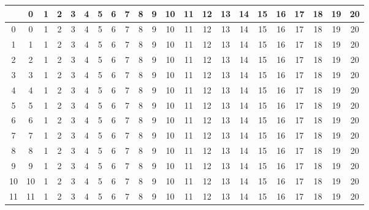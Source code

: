 \documentclass[10pt]{article}
\begin{document}

\newpage



\setlength\extrarowheight{5pt}

\begin{table}[ht]
  \centering
  \begin{tabular}{c|ccc|ccc|ccc|ccc|ccc|ccc|ccc}
    \hline
      & 0 & 1 & 2 & 3 & 4 & 5 & 6 & 7 & 8 & 9 & 10 & 11 & 12 & 13 & 14 & 15 & 16 & 17 & 18 & 19 & 20\\\hline

    \rowcolor{LightCyan}
    0 & 0 & 1 & 2 & 3 & 4 & 5 & 6 & 7 & 8 & 9 & 10 & 11 & 12 & 13 & 14 & 15 & 16 & 17 & 18 & 19 & 20\\
    \rowcolor{LightCyan}
    1 & 1 & 1 & 2 & 3 & 4 & 5 & 6 & 7 & 8 & 9 & 10 & 11 & 12 & 13 & 14 & 15 & 16 & 17 & 18 & 19 & 20\\
    \rowcolor{LightCyan}
    2 & 2 & 1 & 2 & 3 & 4 & 5 & 6 & 7 & 8 & 9 & 10 & 11 & 12 & 13 & 14 & 15 & 16 & 17 & 18 & 19 & 20\\

    3 & 3 & 1 & 2 & 3 & 4 & 5 & 6 & 7 & 8 & 9 & 10 & 11 & 12 & 13 & 14 & 15 & 16 & 17 & 18 & 19 & 20\\
    4 & 4 & 1 & 2 & 3 & 4 & 5 & 6 & 7 & 8 & 9 & 10 & 11 & 12 & 13 & 14 & 15 & 16 & 17 & 18 & 19 & 20\\
    5 & 5 & 1 & 2 & 3 & 4 & 5 & 6 & 7 & 8 & 9 & 10 & 11 & 12 & 13 & 14 & 15 & 16 & 17 & 18 & 19 & 20\\

    \rowcolor{LightCyan}
    6 & 6 & 1 & 2 & 3 & 4 & 5 & 6 & 7 & 8 & 9 & 10 & 11 & 12 & 13 & 14 & 15 & 16 & 17 & 18 & 19 & 20\\
    \rowcolor{LightCyan}
    7 & 7 & 1 & 2 & 3 & 4 & 5 & 6 & 7 & 8 & 9 & 10 & 11 & 12 & 13 & 14 & 15 & 16 & 17 & 18 & 19 & 20\\
    \rowcolor{LightCyan}
    8 & 8 & 1 & 2 & 3 & 4 & 5 & 6 & 7 & 8 & 9 & 10 & 11 & 12 & 13 & 14 & 15 & 16 & 17 & 18 & 19 & 20\\

    9 & 9 & 1 & 2 & 3 & 4 & 5 & 6 & 7 & 8 & 9 & 10 & 11 & 12 & 13 & 14 & 15 & 16 & 17 & 18 & 19 & 20\\
    10 & 10 & 1 & 2 & 3 & 4 & 5 & 6 & 7 & 8 & 9 & 10 & 11 & 12 & 13 & 14 & 15 & 16 & 17 & 18 & 19 & 20\\
    11 & 11 & 1 & 2 & 3 & 4 & 5 & 6 & 7 & 8 & 9 & 10 & 11 & 12 & 13 & 14 & 15 & 16 & 17 & 18 & 19 & 20\\


\end{tabular}
\end{table}
\end{document}

